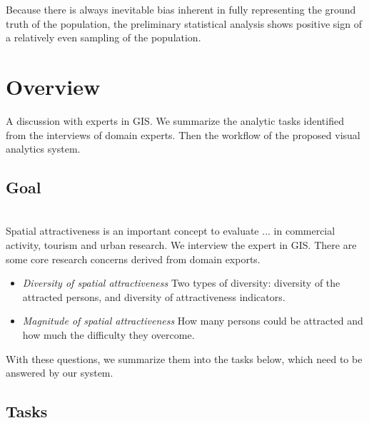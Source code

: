 Because there is always inevitable bias inherent in fully representing the ground truth of the population, the preliminary statistical analysis shows positive sign of a relatively even sampling of the population.


\section{Overview}

A discussion with experts in GIS. We summarize the analytic tasks identified from the interviews of domain experts. Then the workflow of the proposed visual analytics system.

\subsection{Goal}
\\

Spatial attractiveness is an important concept to evaluate ... in commercial activity, tourism and urban research. We interview the expert in GIS.  There are some core research concerns derived from domain exports.

\begin{itemize}
  \item \textit{Diversity of spatial attractiveness} Two types of diversity: diversity of the attracted persons, and diversity of attractiveness indicators. 
  \item \textit{Magnitude of spatial attractiveness} How many persons could be attracted and how much the difficulty they overcome. 
\end{itemize}
With these questions, we summarize them into the tasks below, which need to be answered by our system.

\subsection{Tasks}

